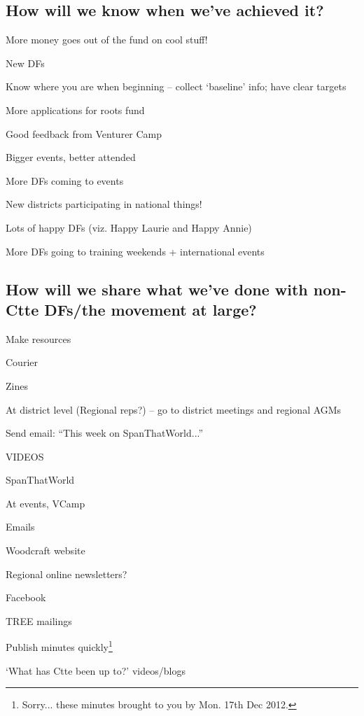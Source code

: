 \documentclass[a4paper, 12pt]{article}
\begin{document}
\subsection{How will we know when we've achieved it?}
\begin{itemize*}
	\item More money goes out of the fund on cool stuff!
	\item New DFs
	\item Know where you are when beginning -- collect `baseline' info; have clear targets
	\item More applications for roots fund
	\item Good feedback from Venturer Camp
	\item Bigger events, better attended
	\item More DFs coming to events
	\item New districts participating in national things!
	\item Lots of happy DFs (viz. Happy Laurie and Happy Annie)
	\item More DFs going to training weekends + international events
\end{itemize*}

\subsection{How will we share what we've done with non-Ctte DFs/the movement at large?}
\begin{itemize*}
	\item Make resources
	\item Courier
	\item Zines
	\item At district level (Regional reps?) -- go to district meetings and regional AGMs
	\item Send email: ``This week on SpanThatWorld...''
	\item VIDEOS
	\item SpanThatWorld
	\item At events, VCamp
	\item Emails
	\item Woodcraft website
	\item Regional online newsletters?
	\item Facebook
	\item TREE mailings
	\item Publish minutes quickly\footnote{Sorry... these minutes brought to you by Mon. 17th Dec 2012.}
	\item `What has Ctte been up to?' videos/blogs
\end{itemize*}
\end{document}
